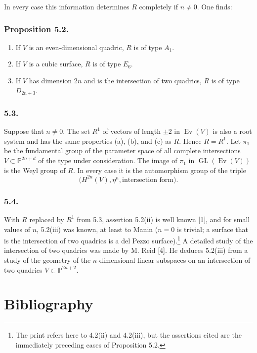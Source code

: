 In every case this information determines $R$ completely if $n\ne0$.  One
finds:

\subsubsection*{Proposition 5.2.}
\begin{enumerate}[label=(\roman*)]
\item If $V$ is an even-dimensional quadric, $R$ is of type $A_1$.
\item If $V$ is a cubic surface, $R$ is of type $E_6$.
\item If $V$ has dimension $2n$ and is the intersection of two quadrics,
  $R$ is of type $D_{2n+3}$.
\end{enumerate}

\subsubsection*{5.3.}
Suppose that $n\ne0$.  The set $R^1$ of vectors of length $\pm2$ in
$\operatorname{Ev}(V)$ is also a root system and has the same properties
(a), (b), and (c) as $R$.  Hence $R=R^1$.  Let $\pi_1$ be the fundamental
group of the parameter space of all complete intersections
$V\subset\mathbb P^{2n+d}$ of the type under consideration.  The image of
$\pi_1$ in $\operatorname{GL}(\operatorname{Ev}(V))$ is the Weyl group of
$R$.  In every case it is the automorphism group of the triple
\[
 \bigl(H^{2n}(V),\eta^n,\text{intersection form}\bigr).
\]

\subsubsection*{5.4.}
With $R$ replaced by $R^1$ from 5.3, assertion 5.2(ii) is well known [1],
and for small values of $n$, 5.2(iii) was known, at least to Manin
($n=0$ is trivial; a surface that is the intersection of two quadrics is a
del Pezzo surface).\footnote{The print refers here to 4.2(ii) and 4.2(iii),
but the assertions cited are the immediately preceding cases of
Proposition 5.2.}  A detailed study of the intersection of two quadrics was
made by M. Reid [4].  He deduces 5.2(iii) from a study of the geometry of
the $n$-dimensional linear subspaces on an intersection of two quadrics
$V\subset\mathbb P^{2n+2}$.

\section*{Bibliography}

